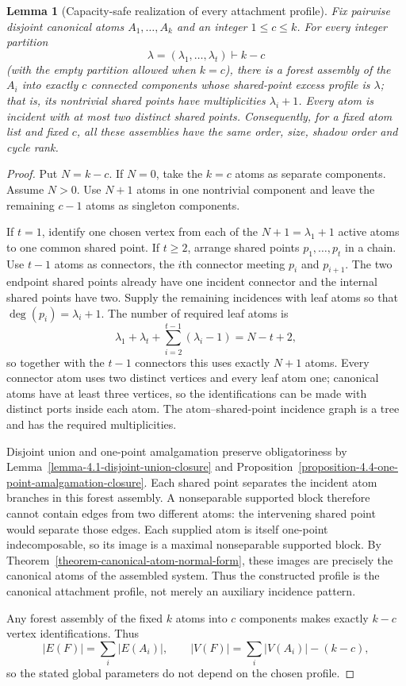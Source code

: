 \documentclass[a4paper,11pt,reqno]{amsart}
\theoremstyle{plain}
\newtheorem{lemma}[theorem]{Lemma}
\theoremstyle{definition}
\theoremstyle{remark}
\begin{document}
\begin{lemma}[Capacity-safe realization of every attachment profile]
\label{lemma-capacity-safe-profile-realization}
Fix pairwise disjoint canonical atoms $A_1,\ldots,A_k$ and an integer
$1\le c\le k$.  For every integer partition
\[
 \lambda=(\lambda_1,\ldots,\lambda_t)\vdash k-c
\]
(with the empty partition allowed when $k=c$), there is a forest assembly of
the $A_i$ into exactly $c$ connected components whose shared-point excess
profile is $\lambda$; that is, its nontrivial shared points have
multiplicities $\lambda_i+1$.  Every atom is incident with at most two
distinct shared points.  Consequently, for a fixed atom list and fixed $c$,
all these assemblies have the same order, size, shadow order and cycle rank.
\end{lemma}
\begin{proof}
Put $N=k-c$.  If $N=0$, take the $k=c$ atoms as separate components.  Assume
$N>0$.  Use $N+1$ atoms in one nontrivial component and leave the remaining
$c-1$ atoms as singleton components.

If $t=1$, identify one chosen vertex from each of the $N+1=\lambda_1+1$
active atoms to one common shared point.  If $t\ge2$, arrange shared points
$p_1,\ldots,p_t$ in a chain.  Use $t-1$ atoms as connectors, the $i$th
connector meeting $p_i$ and $p_{i+1}$.  The two endpoint shared points already
have one incident connector and the internal shared points have two.  Supply
the remaining incidences with leaf atoms so that
$\deg(p_i)=\lambda_i+1$.  The number of required leaf atoms is
\[
 \lambda_1+\lambda_t+\sum_{i=2}^{t-1}(\lambda_i-1)
   =N-t+2,
\]
so together with the $t-1$ connectors this uses exactly $N+1$ atoms.  Every
connector atom uses two distinct vertices and every leaf atom one; canonical
atoms have at least three vertices, so the identifications can be made with
distinct ports inside each atom.  The atom--shared-point incidence graph is a
tree and has the required multiplicities.

Disjoint union and one-point amalgamation preserve obligatoriness by
Lemma~\ref{lemma-4.1-disjoint-union-closure} and
Proposition~\ref{proposition-4.4-one-point-amalgamation-closure}.
Each shared point separates the incident atom branches in this forest
assembly.  A nonseparable supported block therefore cannot contain edges
from two different atoms: the intervening shared point would separate
those edges.  Each supplied atom is itself one-point indecomposable, so its
image is a maximal nonseparable supported block.  By
Theorem~\ref{theorem-canonical-atom-normal-form}, these images are precisely
the canonical atoms of the assembled system.  Thus the constructed profile
is the canonical attachment profile, not merely an auxiliary incidence
pattern.

Any forest assembly of the fixed $k$ atoms into $c$ components makes exactly
$k-c$ vertex identifications.  Thus
\[
 |E(F)|=\sum_i|E(A_i)|,
 \qquad
 |V(F)|=\sum_i|V(A_i)|-(k-c),
\]
so the stated global parameters do not depend on the chosen profile.
\end{proof}
\end{document}
